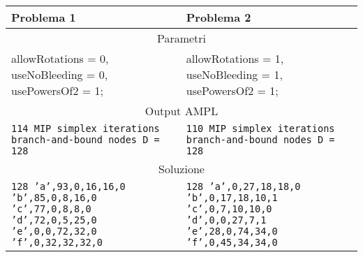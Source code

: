 \begin{table}[H]
\centering
\footnotesize
\begin{tabular}{p{6cm}|p{6cm}}
\textbf{Problema 1} & \textbf{Problema 2} \\ 
\hline
\multicolumn{2}{|c|}{Parametri} \\ 
\hline
allowRotations = 0,\newline
useNoBleeding = 0,\newline
usePowersOf2 = 1;	& 
allowRotations = 1,\newline
useNoBleeding = 1,\newline
usePowersOf2 = 1;	\\
\hline
\multicolumn{2}{|c|}{Output AMPL} \\
\hline
\texttt{114 MIP simplex iterations\newline
0 branch-and-bound nodes\newline
D = 128}
&
\texttt{110 MIP simplex iterations\newline
0 branch-and-bound nodes\newline
D = 128}
\\
\hline
\multicolumn{2}{|c|}{Soluzione} \\
\hline
\texttt{128\newline
'a',93,0,16,16,0\newline
'b',85,0,8,16,0\newline
'c',77,0,8,8,0\newline
'd',72,0,5,25,0\newline
'e',0,0,72,32,0\newline
'f',0,32,32,32,0}
&
\texttt{128\newline
'a',0,27,18,18,0\newline
'b',0,17,18,10,1\newline
'c',0,7,10,10,0\newline
'd',0,0,27,7,1\newline
'e',28,0,74,34,0\newline
'f',0,45,34,34,0}
\\
   
\end{tabular}
\end{table}























